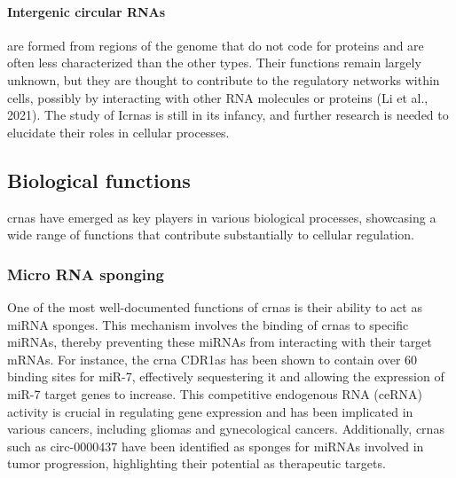 \paragraph{Intergenic circular RNAs} are formed from regions of
the
genome
that do not code for proteins and are often less characterized than the other
types.
Their functions remain largely unknown, but they are thought to contribute to
the regulatory networks within cells, possibly by interacting with other RNA
molecules or proteins (Li et al., 2021).
The study of I\gls{crna}s is still in its infancy, and further research is
needed to elucidate their roles in cellular processes.

\subsection{Biological functions}
\label{sec:circrna_functions}
\gls{crna}s have emerged as key players in various biological processes,
showcasing
a wide range of functions that contribute substantially to cellular regulation.

\subsubsection{Micro RNA sponging}
One of the most well-documented functions of \gls{crna}s is their ability to
act as miRNA sponges.
This mechanism involves the binding of \gls{crna}s to specific miRNAs, thereby
preventing these miRNAs from interacting with their target mRNAs.
For instance, the \gls{crna} CDR1as has been shown to contain over 60 binding
sites for miR-7, effectively sequestering it and allowing the expression of
miR-7 target genes to
increase\supercite{guo_expanded_2014,yuan_regulatory_2020}.
This competitive endogenous RNA (ceRNA) activity is crucial in regulating gene
expression and has been implicated in various cancers, including gliomas and
gynecological cancers\supercite{dong_expression_2020,song_circular_2016}.
Additionally, \gls{crna}s such as circ-0000437 have been identified as sponges
for miRNAs involved in tumor progression, highlighting their potential as
therapeutic targets\supercite{li_peptide_2021,cui_circular_2022}.

